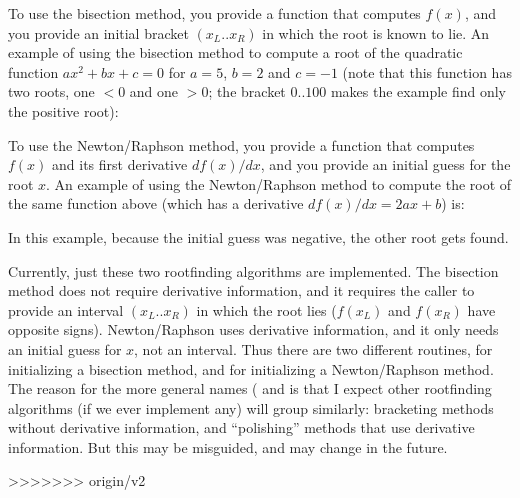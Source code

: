 To use the bisection method, you provide a function that computes
$f(x)$, and you provide an initial bracket $(x_L..x_R)$ in which the
root is known to lie.  An example of using the bisection method to
compute a root of the quadratic function $ax^2 + bx + c = 0$ for
$a=5$, $b=2$ and $c=-1$ (note that this function has two roots, one
$<0$ and one $>0$; the bracket $0..100$ makes the example find only
the positive root):




To use the Newton/Raphson method, you provide a function that computes
$f(x)$ and its first derivative $df(x)/dx$, and you provide an initial
guess for the root $x$. An example of using the Newton/Raphson method
to compute the root of the same function above (which has a derivative
$df(x)/dx = 2ax + b$) is:



In this example, because the initial guess was negative, the other
root gets found.

Currently, just these two rootfinding algorithms are implemented.  The
bisection method does not require derivative information, and it
requires the caller to provide an interval $(x_L..x_R)$ in which the
root lies ($f(x_L)$ and $f(x_R)$ have opposite signs). Newton/Raphson
uses derivative information, and it only needs an initial guess for
$x$, not an interval. Thus there are two different 
routines,  for initializing
a bisection method, and  for
initializing a Newton/Raphson method. The reason for the more general
names ( and  is that
I expect other rootfinding algorithms (if we ever implement any) will
group similarly: bracketing methods without derivative information,
and ``polishing'' methods that use derivative information. But this
may be misguided, and may change in the future.


>>>>>>> origin/v2
